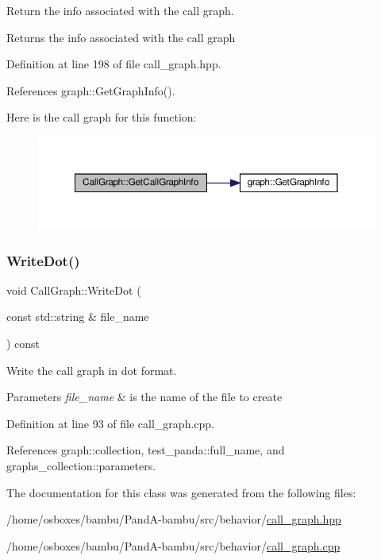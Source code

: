 Return the info associated with the call graph. 

\begin{DoxyReturn}{Returns}
the info associated with the call graph 
\end{DoxyReturn}


Definition at line 198 of file call\+\_\+graph.\+hpp.



References graph\+::\+Get\+Graph\+Info().

Here is the call graph for this function\+:
\nopagebreak
\begin{figure}[H]
\begin{center}
\leavevmode
\includegraphics[width=350pt]{d0/d52/classCallGraph_a211db8d8f8ff5698449bb0658ac22fd5_cgraph}
\end{center}
\end{figure}
\mbox{\label{classCallGraph_a6e287e497ccea0c37060292271c0c118}} 
\subsubsection{\texorpdfstring{Write\+Dot()}{WriteDot()}}
{\footnotesize\ttfamily void Call\+Graph\+::\+Write\+Dot (\begin{DoxyParamCaption}\item[{const std\+::string \&}]{file\+\_\+name }\end{DoxyParamCaption}) const}



Write the call graph in dot format. 


\begin{DoxyParams}{Parameters}
{\em file\+\_\+name} & is the name of the file to create \\
\hline
\end{DoxyParams}


Definition at line 93 of file call\+\_\+graph.\+cpp.



References graph\+::collection, test\+\_\+panda\+::full\+\_\+name, and graphs\+\_\+collection\+::parameters.



The documentation for this class was generated from the following files\+:\begin{DoxyCompactItemize}
\item 
/home/osboxes/bambu/\+Pand\+A-\/bambu/src/behavior/\hyperlink{call__graph_8hpp}{call\+\_\+graph.\+hpp}\item 
/home/osboxes/bambu/\+Pand\+A-\/bambu/src/behavior/\hyperlink{call__graph_8cpp}{call\+\_\+graph.\+cpp}\end{DoxyCompactItemize}
